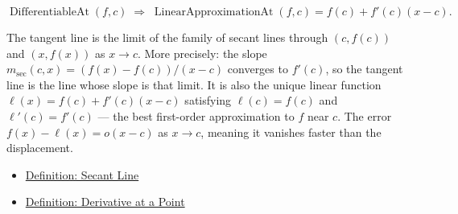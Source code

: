\begin{remark*}
\[
\operatorname{DifferentiableAt}(f, c) \;\Rightarrow\;
\operatorname{LinearApproximationAt}(f, c) = f(c) + f'(c)(x - c).
\]
\end{remark*}

\begin{remark*}[Interpretation]
The tangent line is the limit of the family of secant lines through $(c, f(c))$ and $(x, f(x))$ as $x \to c$. More precisely: the slope $m_{\mathrm{sec}}(c, x) = (f(x)-f(c))/(x-c)$ converges to $f'(c)$, so the tangent line is the line whose slope is that limit. It is also the unique linear function $\ell(x) = f(c) + f'(c)(x-c)$ satisfying $\ell(c) = f(c)$ and $\ell'(c) = f'(c)$ --- the best first-order approximation to $f$ near $c$. The error $f(x) - \ell(x) = o(x-c)$ as $x \to c$, meaning it vanishes faster than the displacement.
\end{remark*}

\begin{remark*}[Dependencies]
\begin{itemize}
  \item \hyperref[def:secant-line]{Definition: Secant Line}
  \item \hyperref[def:derivative-at-a-point]{Definition: Derivative at a Point}
\end{itemize}
\end{remark*}


